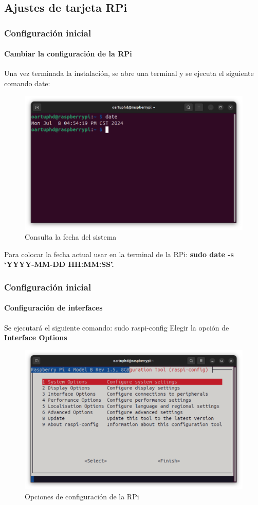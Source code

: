 \documentclass{beamer}
\begin{document}
	\subsection{Ajustes de tarjeta RPi}
	\begin{frame}
		\frametitle{Configuración inicial}
		\framesubtitle{Cambiar la configuración de la RPi}
		
		Una vez terminada la instalación, se abre una terminal y se ejecuta el siguiente comando date: 
		\begin{figure}
			\includegraphics[scale=0.25]{daterpi.png}
			\caption{Consulta la fecha del sistema}
		\end{figure}
		Para colocar la fecha actual usar en la terminal de la RPi: \textbf{sudo date -s ‘YYYY-MM-DD HH:MM:SS'.}
		
	\end{frame}
	
	\begin{frame}
		\frametitle{Configuración inicial}
		\framesubtitle{Configuración de interfaces}
		Se ejecutará el siguiente comando: sudo raspi-config \newline
		Elegir la opción de \textbf{Interface Options}
		\begin{figure}
			\includegraphics[scale=0.25]{configrpi.png}
			\caption{Opciones de configuración de la RPi}
		\end{figure}
	
		
	\end{frame}
	
\end{document}
